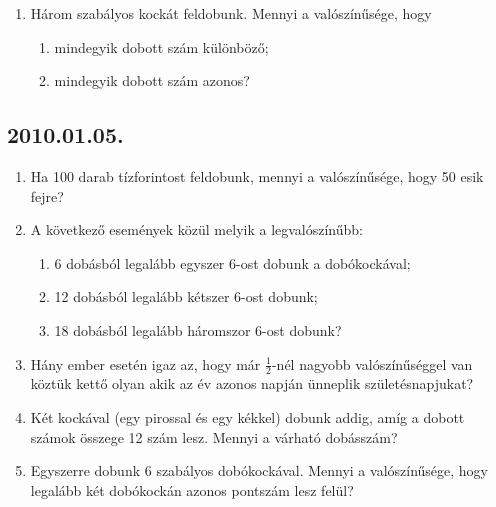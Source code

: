 \documentclass{article}
\newenvironment{abc}{\begin{enumerate}[label=\textit{\alph*})]}{\end{enumerate}}
\begin{document}
\begin{enumerate}
\begin{center}
\end{center}
\item Három szabályos kockát feldobunk. Mennyi a valószínűsége, hogy
\begin{abc}
\item mindegyik dobott szám különböző;
\item mindegyik dobott szám azonos?
\end{abc}
\end{enumerate}

\subsection*{2010.01.05.}
\begin{enumerate}
\item Ha 100 darab tízforintost feldobunk, mennyi a valószínűsége, hogy 50 esik fejre?
\item A következő események közül melyik a legvalószínűbb:
\begin{abc}
\item 6 dobásból legalább egyszer 6-ost dobunk a dobókockával;
\item 12 dobásból legalább kétszer 6-ost dobunk;
\item 18 dobásból legalább háromszor 6-ost dobunk?
\end{abc}
\item Hány ember esetén igaz az, hogy már $\frac{1}{2}$-nél nagyobb valószínűséggel van köztük kettő olyan akik az év azonos napján ünneplik születésnapjukat?
\item Két kockával (egy pirossal és egy kékkel) dobunk addig, amíg a dobott számok összege 12 szám lesz. Mennyi a várható dobásszám?
\item Egyszerre dobunk 6 szabályos dobókockával. Mennyi a valószínűsége, hogy legalább két dobókockán azonos pontszám lesz felül?
\end{enumerate}
\end{document}
